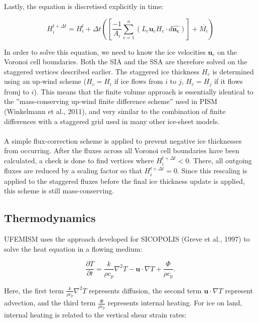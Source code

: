 \documentclass{article}
\begin{document}
Lastly, the equation is discretised explicitly in time:

\begin{equation}
H_i^{t+\Delta t} = H_i^t + \Delta t \left( \left[ \frac{-1}{A_i} \sum_{c=1}^n \left( L_c \mathbf{u}_c H_c \cdot d\mathbf{\hat{n_c}} \right) \right] + \overline{M_i} \right)
\end{equation}

In order to solve this equation, we need to know the ice velocities $\textbf{u}_c$ on the Voronoi cell boundaries. Both the SIA and the SSA are therefore solved on the staggered vertices described earlier. The staggered ice thickness $H_c$ is determined using an up-wind scheme ($H_c=H_i$ if ice flows from $i$ to $j$, $H_c=H_j$ if it flows from$ $j to $i$). This means that the finite volume approach is essentially identical to the ''mass-conserving up-wind finite difference scheme'' used in PISM (Winkelmann et al., 2011), and very similar to the combination of finite differences with a staggered grid used in many other ice-sheet models.\\
\\
A simple flux-correction scheme is applied to prevent negative ice thicknesses from occurring. After the fluxes across all Voronoi cell boundaries have been calculated, a check is done to find vertices where $H_i^{t+\Delta t}<0$. There, all outgoing fluxes are reduced by a scaling factor so that $H_i^{t+\Delta t}=0$. Since this rescaling is applied to the staggered fluxes before the final ice thickness update is applied, this scheme is still mass-conserving.

\subsection{Thermodynamics}

UFEMISM uses the approach developed for SICOPOLIS (Greve et al., 1997) to solve the heat equation in a flowing medium:

\begin{equation}
\frac{\partial T}{\partial t} = \frac{k}{\rho c_p} \nabla^2 T - \mathbf{u} \cdot \nabla T + \frac{\Phi}{\rho c_p}.
\end{equation}

Here, the first term $\frac{k}{\rho c_p} \nabla^2 T$ represents diffusion, the second term $\mathbf{u} \cdot \nabla T$ represent advection, and the third term $\frac{\Phi}{\rho c_p}$ represents internal heating. For ice on land, internal heating is related to the vertical shear strain rates:
\end{document}
